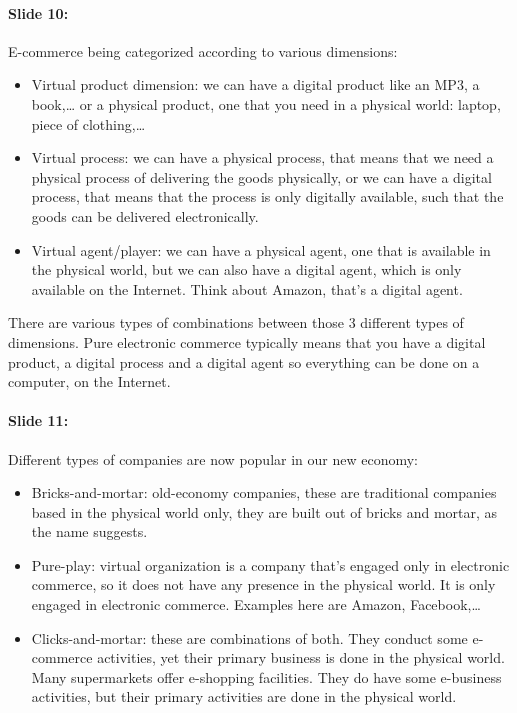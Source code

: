 \documentclass[10pt,a4paper]{report}
\begin{document}
\paragraph{Slide 10:}E-commerce being categorized according to various dimensions:
\begin{itemize}
\item Virtual product dimension: we can have a digital product like an MP3, a book,… or a physical product, one that you need in a physical world: laptop, piece of clothing,… 
\item Virtual process: we can have a physical process, that means that we need a physical process of delivering the goods physically, or we can have a digital process, that means that the process is only digitally available, such that the goods can be delivered electronically.
\item Virtual agent/player: we can have a physical agent, one that is available in the physical world, but we can also have a digital agent, which is only available on the Internet. Think about Amazon, that's a digital agent.
\end{itemize}
There are various types of combinations between those 3 different types of dimensions. Pure electronic commerce typically means that you have a digital product, a digital process and a digital agent so everything can be done on a computer, on the Internet.

\paragraph{Slide 11:}Different types of companies are now popular in our new economy:
\begin{itemize}
\item Bricks-and-mortar: old-economy companies, these are traditional companies based in the physical world only, they are built out of bricks and mortar, as the name suggests.
\item Pure-play: virtual organization is a company that's engaged only in electronic commerce, so it does not have any presence in the physical world. It is only engaged in electronic commerce. Examples here are Amazon, Facebook,… 
\item Clicks-and-mortar: these are combinations of both. They conduct some e-commerce activities, yet their primary business is done in the physical world. Many supermarkets offer e-shopping facilities. They do have some e-business activities, but their primary activities are done in the physical world.
\end{itemize}
\end{document}
